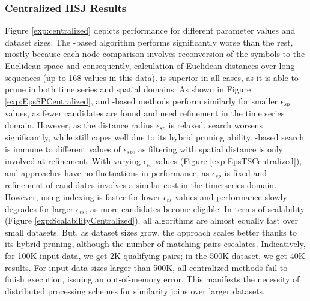 \subsubsection{Centralized HSJ Results}
\label{subsec:centralized_results}

Figure \ref{exp:centralized} depicts performance for different parameter values and dataset sizes. The \isax-based algorithm performs significantly worse than the rest, mostly because each node comparison involves reconversion of the \isax symbols to the Euclidean space \cite{shieh2008kdd} and consequently, calculation of Euclidean distances over long sequences (up to 168 values in this data). \btsr is superior in all cases, as it is able to prune in both time series and spatial domains. As shown in Figure \ref{exp:EpsSPCentralized}, \btsr and \rtree-based methods perform similarly for smaller $\epsilon_{sp}$ values, as fewer candidates are found and need refinement in the time series domain. However, as the distance radius $\epsilon_{sp}$ is relaxed, \rtree search worsens significantly, while \btsr still copes well due to its hybrid pruning ability. \isax-based search is immune to different values of $\epsilon_{sp}$, as filtering with spatial distance is only involved at refinement. With varying $\epsilon_{ts}$ values (Figure \ref{exp:EpsTSCentralized}), \btsr and \rtree approaches have no fluctuations in performance, as $\epsilon_{sp}$ is fixed and refinement of candidates involves a similar cost in the time series domain. However, using \isax indexing is faster for lower $\epsilon_{ts}$ values and performance slowly degrades for larger $\epsilon_{ts}$, as more candidates become eligible. In terms of scalability (Figure \ref{exp:ScalabilityCentralized}), all algorithms are almost equally fast over small datasets. But, as dataset sizes grow, the \btsr approach scales better thanks to its hybrid pruning, although the number of matching pairs escalates. Indicatively, for 100K input data, we get 2K qualifying pairs; in the 500K dataset, we get 40K results. For input data sizes larger than 500K, all centralized methods fail to finish execution, issuing an out-of-memory error. This manifests the necessity of distributed processing schemes for similarity joins over larger datasets.

